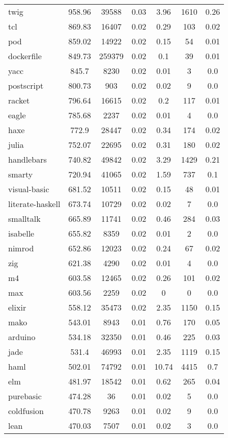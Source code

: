\begin{longtable}{l|ccc|ccc}
twig & 958.96 & 39588 & 0.03 & 3.96 & 1610 & 0.26 \\
tcl & 869.83 & 16407 & 0.02 & 0.29 & 103 & 0.02 \\
pod & 859.02 & 14922 & 0.02 & 0.15 & 54 & 0.01 \\
dockerfile & 849.73 & 259379 & 0.02 & 0.1 & 39 & 0.01 \\
yacc & 845.7 & 8230 & 0.02 & 0.01 & 3 & 0.0 \\
postscript & 800.73 & 903 & 0.02 & 0.02 & 9 & 0.0 \\
racket & 796.64 & 16615 & 0.02 & 0.2 & 117 & 0.01 \\
eagle & 785.68 & 2237 & 0.02 & 0.01 & 4 & 0.0 \\
haxe & 772.9 & 28447 & 0.02 & 0.34 & 174 & 0.02 \\
julia & 752.07 & 22695 & 0.02 & 0.31 & 180 & 0.02 \\
handlebars & 740.82 & 49842 & 0.02 & 3.29 & 1429 & 0.21 \\
smarty & 720.94 & 41065 & 0.02 & 1.59 & 737 & 0.1 \\
visual-basic & 681.52 & 10511 & 0.02 & 0.15 & 48 & 0.01 \\
literate-haskell & 673.74 & 10729 & 0.02 & 0.02 & 7 & 0.0 \\
smalltalk & 665.89 & 11741 & 0.02 & 0.46 & 284 & 0.03 \\
isabelle & 655.82 & 8359 & 0.02 & 0.01 & 2 & 0.0 \\
nimrod & 652.86 & 12023 & 0.02 & 0.24 & 67 & 0.02 \\
zig & 621.38 & 4290 & 0.02 & 0.01 & 4 & 0.0 \\
m4 & 603.58 & 12465 & 0.02 & 0.26 & 101 & 0.02 \\
max & 603.56 & 2259 & 0.02 & 0 & 0 & 0.0 \\
elixir & 558.12 & 35473 & 0.02 & 2.35 & 1150 & 0.15 \\
mako & 543.01 & 8943 & 0.01 & 0.76 & 170 & 0.05 \\
arduino & 534.18 & 32350 & 0.01 & 0.46 & 225 & 0.03 \\
jade & 531.4 & 46993 & 0.01 & 2.35 & 1119 & 0.15 \\
haml & 502.01 & 74792 & 0.01 & 10.74 & 4415 & 0.7 \\
elm & 481.97 & 18542 & 0.01 & 0.62 & 265 & 0.04 \\
purebasic & 474.28 & 36 & 0.01 & 0.02 & 5 & 0.0 \\
coldfusion & 470.78 & 9263 & 0.01 & 0.02 & 9 & 0.0 \\
lean & 470.03 & 7507 & 0.01 & 0.02 & 3 & 0.0 \\

\end{longtable}
